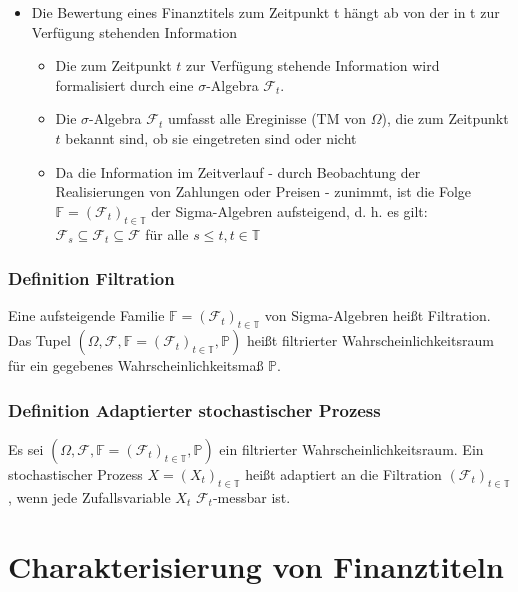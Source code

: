 \documentclass[12pt]{report}
\theoremstyle{dotless}
\theoremstyle{definition}
\begin{document}
\begin{itemize}
\item Die Bewertung eines Finanztitels zum Zeitpunkt t hängt ab von der in t zur
Verfügung stehenden Information
\begin{itemize}
\item Die zum Zeitpunkt $t$ zur Verfügung stehende Information wird formalisiert
durch eine $\sigma$-Algebra $\mathcal{F}_t$.
\item Die $\sigma$-Algebra $\mathcal{F}_t$ umfasst alle Ereginisse (TM von $\Omega$), die zum Zeitpunkt $t$ bekannt sind, ob sie eingetreten sind oder nicht
\item Da die Information im Zeitverlauf - durch Beobachtung der Realisierungen
von Zahlungen oder Preisen - zunimmt, ist die Folge $\mathbb{F}=(\mathcal{F}_t)_{t \in \mathbb{T}}$ der Sigma-Algebren aufsteigend, d. h. es gilt: $\mathcal{F}_s \subseteq \mathcal{F}_t \subseteq \mathcal{F}$ für alle $s \leq t, t \in \mathbb{T}$
\end{itemize}
\end{itemize}

\subsubsection{Definition Filtration}
Eine aufsteigende Familie $\mathbb{F}=(\mathcal{F}_t)_{t \in \mathbb{T}}$ von Sigma-Algebren heißt Filtration. Das Tupel $(\Omega, \mathcal{F}, \mathbb{F} = (\mathcal{F}_t)_{t \in \mathbb{T}}, \mathbb{P})$ heißt filtrierter
Wahrscheinlichkeitsraum für ein gegebenes Wahrscheinlichkeitsmaß $\mathbb{P}$.

\subsubsection{Definition Adaptierter stochastischer Prozess}
Es sei $(\Omega, \mathcal{F}, \mathbb{F} = (\mathcal{F}_t)_{t \in \mathbb{T}}, \mathbb{P})$ ein filtrierter Wahrscheinlichkeitsraum. Ein
stochastischer Prozess $X=(X_t)_{t \in \mathbb{T}}$ heißt adaptiert an die Filtration $(\mathcal{F}_t)_{t \in \mathbb{T}}$, wenn jede Zufallsvariable $X_t$ $\mathcal{F}_t$-messbar ist.


\section{Charakterisierung von Finanztiteln}
\end{document}
